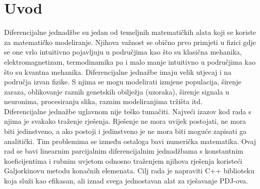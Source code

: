 \documentclass[zavrsnirad]{../fer}
\begin{document}
\chapter{Uvod}
\label{pog:uvod}
Diferencijalne jednadžbe su jedan od temeljnih matematičkih
alata koji se koriste za matematičko modeliranje. Njihova
važnost se obično prvo primjeti u fizici gdje se one vrlo
intuitivno pojavljuju u područjima kao što su klasična mehanika,
elektromagnetizam, termodinamika pa i malo manje intuitivno u
područjima kao što su kvantna mehanika. Diferencijalne jednažbe
imaju velik utjecaj i na područja izvan fizike.
S njima se mogu modelirati izmjene populacija, širenje zaraza,
oblikovanje raznih genetskih obilježja (uzoraka),
širenje signala u neuronima, procesiranju slika, raznim
modeliranjima tržišta itd.
\bigskip
\\
Diferencijalne jednažbe uglavnom nije teško tumačiti. Najveći
izazov kod rada s njima je svakako traženje rješenja.
Rješenje ne mora uvijek postojati, ne mora biti jedinstveno,
a ako postoji i jedinstveno je ne mora biti moguće zapisati
ga analitički. Tim problemima se između ostaloga bavi numerička
matematika. Ovaj rad se bavi linearnim parcijalnim diferencijalnim
jednadžbama s konstantnim koeficijentima i rubnim uvjetom odnosno
traženjem njihova rješenja koristeći Galjorkinovu metodu
konačnih elemenata. Cilj rada je napraviti
C++ biblioteku koja služi kao efikasan, ali iznad svega
jednostavan alat za rješavanje PDJ-ova.
%
%
%
\end{document}
